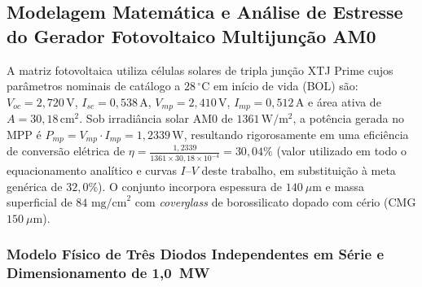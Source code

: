 \subsection{Modelagem Matemática e Análise de Estresse do Gerador Fotovoltaico Multijunção AM0}

A matriz fotovoltaica utiliza células solares de tripla junção XTJ Prime cujos parâmetros nominais de catálogo a $28\,^\circ\mathrm{C}$ em início de vida (BOL) são: $V_{oc} = 2{,}720\,\mathrm{V}$, $I_{sc} = 0{,}538\,\mathrm{A}$, $V_{mp} = 2{,}410\,\mathrm{V}$, $I_{mp} = 0{,}512\,\mathrm{A}$ e área ativa de $A = 30{,}18\,\mathrm{cm^2}$. Sob irradiância solar AM0 de $1361\,\mathrm{W/m^2}$, a potência gerada no MPP é $P_{mp} = V_{mp} \cdot I_{mp} = 1{,}2339\,\mathrm{W}$, resultando rigorosamente em uma eficiência de conversão elétrica de $\eta = \frac{1{,}2339}{1361 \times 30{,}18 \times 10^{-4}} = 30{,}04\%$ (valor utilizado em todo o equacionamento analítico e curvas $I$--$V$ deste trabalho, em substituição à meta genérica de $32{,}0\%$). O conjunto incorpora espessura de $140\ \mu\text{m}$ e massa superficial de $84\text{ mg/cm}^2$ com \textit{coverglass} de borossilicato dopado com cério (CMG $150\ \mu\text{m}$).

\subsubsection{Modelo Físico de Três Diodos Independentes em Série e Dimensionamento de 1,0~MW}


